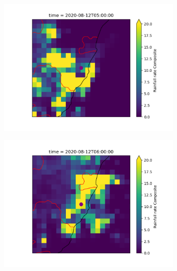 \documentclass[12pt,a4paper]{report}
\begin{document}
\begin{figure}[H]
    \centering

    \begin{subfigure}{0.48\textwidth}
        \centering
        \includegraphics[width=\linewidth]{stonerain5}
    \end{subfigure}
    \hfill
    \begin{subfigure}{0.48\textwidth}
        \centering
        \includegraphics[width=\linewidth]{stonerain6}
    \end{subfigure}

    \vspace{\baselineskip}


\end{figure}
\end{document}
